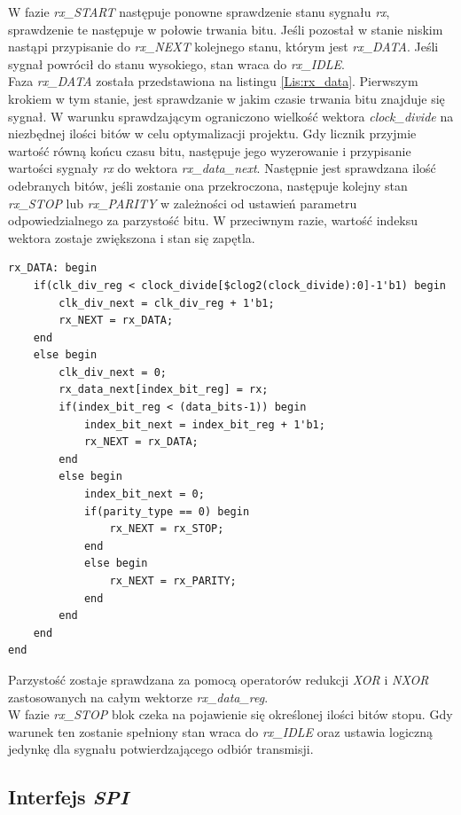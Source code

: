 \documentclass[11pt,a4paper]{article}
\begin{document}
W fazie \textit{rx\_START} następuje ponowne sprawdzenie stanu sygnału \textit{rx}, sprawdzenie te następuje w połowie trwania bitu. Jeśli pozostał w stanie niskim nastąpi przypisanie do \textit{rx\_NEXT} kolejnego stanu, którym jest \textit{rx\_DATA}. Jeśli sygnał powrócił do stanu wysokiego, stan wraca do \textit{rx\_IDLE}.\\
Faza \textit{rx\_DATA} została przedstawiona na listingu \ref{Lis:rx_data}. Pierwszym krokiem w tym stanie, jest sprawdzanie w jakim czasie trwania bitu znajduje się sygnał. W warunku sprawdzającym ograniczono wielkość wektora \textit{clock\_divide} na niezbędnej ilości bitów w celu optymalizacji projektu. Gdy licznik przyjmie wartość  równą końcu czasu bitu, następuje jego wyzerowanie i przypisanie wartości sygnały \textit{rx} do wektora \textit{rx\_data\_next}. Następnie jest sprawdzana ilość odebranych bitów, jeśli zostanie ona przekroczona, następuje kolejny stan \textit{rx\_STOP} lub \textit{rx\_PARITY} w zależności od ustawień parametru odpowiedzialnego za parzystość bitu. W przeciwnym razie, wartość indeksu wektora zostaje zwiększona i stan się zapętla.\\			\begin{minipage}{\textwidth}
\begin{scriptsize}
\begin{lstlisting}[label=Lis:rx_data,caption=Stan \textit{rx\_DATA}]
rx_DATA: begin
	if(clk_div_reg < clock_divide[$clog2(clock_divide):0]-1'b1) begin
		clk_div_next = clk_div_reg + 1'b1;
		rx_NEXT = rx_DATA;
	end
	else begin
		clk_div_next = 0;
		rx_data_next[index_bit_reg] = rx;
		if(index_bit_reg < (data_bits-1)) begin
			index_bit_next = index_bit_reg + 1'b1;
			rx_NEXT = rx_DATA;
		end
		else begin
			index_bit_next = 0;
			if(parity_type == 0) begin
				rx_NEXT = rx_STOP;
			end
			else begin
				rx_NEXT = rx_PARITY;
			end
		end
	end
end
\end{lstlisting}
\end{scriptsize}
\end{minipage}	
Parzystość zostaje sprawdzana za pomocą operatorów redukcji \textit{XOR} i \textit{NXOR} zastosowanych na całym wektorze \textit{rx\_data\_reg}. \\
W fazie \textit{rx\_STOP} blok czeka na pojawienie się określonej ilości bitów stopu. Gdy warunek ten zostanie spełniony stan wraca do \textit{rx\_IDLE} oraz ustawia logiczną jedynkę dla sygnału potwierdzającego odbiór transmisji.
\subsection{Interfejs \textit{SPI}}
\end{document}
